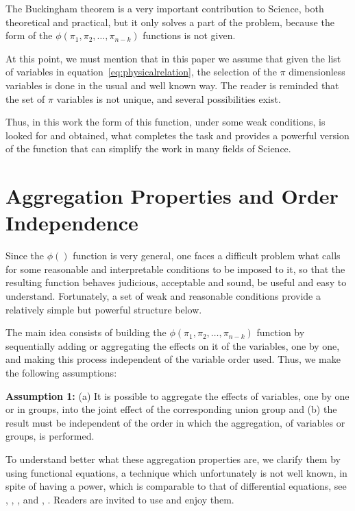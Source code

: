 \documentclass[
	11pt, %
	fleqn, %
	a4paper, %
]{LegrandOrangeBook}
\begin{document}
The Buckingham theorem is a very important contribution to Science, both theoretical and practical, but it only solves a part of the problem, because the form of the $\phi(\pi_1,\pi_2,\ldots,\pi_{n-k})$ functions is not given.

At this point, we must mention that in this paper we assume that given the list of variables in equation~\eqref{eq:physicalrelation}, the selection of the $\pi$ dimensionless variables is done in the usual and well known way. The reader is reminded that the set of $\pi$ variables is not unique, and several possibilities exist.

Thus, in this work the form of this function, under some weak conditions, is looked for and obtained, what completes the task and provides a powerful version of the function that can simplify the work in many fields of Science.

\section{Aggregation Properties and Order Independence}
Since the $\phi()$ function is very general, one faces a difficult problem what calls for some reasonable and interpretable conditions to be imposed to it, so that the resulting function behaves judicious, acceptable and sound, be useful and easy to understand. Fortunately, a set of weak and reasonable conditions provide a relatively simple but powerful structure below.

The main idea consists of building the $\phi(\pi_1,\pi_2,\ldots,\pi_{n-k})$ function by sequentially adding or aggregating the effects on it of the variables, one by one, and making this process independent of the variable order used. Thus, we make the following assumptions:

\textbf{Assumption 1:} (a) It is possible to aggregate the effects of variables, one by one or in groups, into the joint effect of the corresponding union group and (b) the result must be independent of the order in which the aggregation, of variables or groups, is performed.

To understand better what these aggregation properties are, we clarify them by using functional equations, a technique which unfortunately is not well known, in spite of having a power, which is comparable to that of differential equations, see \cite{aczel1964functional}, \cite{aczel2006lectures}, \cite{aczel1989functional}, \cite{castillo1992functional} and \cite{castillo2004functional}, \cite{alsina2006associative}. Readers are invited to use and enjoy them.
\end{document}
